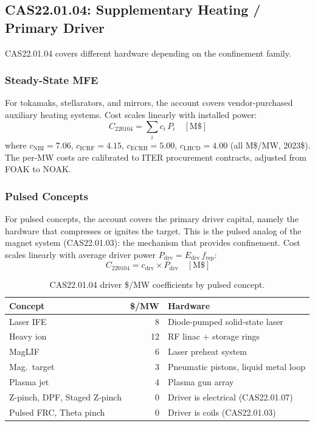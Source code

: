 \documentclass{article}
\begin{document}
\subsection{CAS22.01.04: Supplementary Heating / Primary Driver}
\label{sec:cas2204}

CAS22.01.04 covers different hardware depending on the confinement
family.

\subsubsection{Steady-State MFE}
For tokamaks, stellarators, and mirrors, the account covers
vendor-purchased auxiliary heating systems.  Cost scales linearly with
installed power:
\begin{equation}
C_{220104} = \sum_i c_i \, P_i \quad [\text{M\$}]
\end{equation}
where $c_{\text{NBI}} = 7.06$, $c_{\text{ICRF}} = 4.15$,
$c_{\text{ECRH}} = 5.00$, $c_{\text{LHCD}} = 4.00$ (all M\$/MW,
2023\$).  The per-MW costs are calibrated to ITER procurement contracts,
adjusted from FOAK to NOAK.

\subsubsection{Pulsed Concepts}
For pulsed concepts, the account covers the primary driver capital, namely
the hardware that compresses or ignites the target.  This is the pulsed
analog of the magnet system (CAS22.01.03): the mechanism that provides
confinement.  Cost scales linearly with average driver power
$P_{\text{drv}} = E_{\text{drv}} \, f_{\text{rep}}$:
\begin{equation}
C_{220104} = c_{\text{drv}} \times P_{\text{drv}} \quad [\text{M\$}]
\end{equation}

\begin{table}[htbp]
\caption{CAS22.01.04 driver \$/MW coefficients by pulsed concept.}
\label{tab:cas2204-driver}
\centering
\begin{tabular}{lrl}
\toprule
Concept & \$/MW & Hardware \\
\midrule
Laser IFE   &  8 & Diode-pumped solid-state laser \\
Heavy ion   & 12 & RF linac + storage rings \\
MagLIF      &  6 & Laser preheat system \\
Mag.\ target &  3 & Pneumatic pistons, liquid metal loop \\
Plasma jet  &  4 & Plasma gun array \\
\midrule
Z-pinch, DPF, Staged Z-pinch & 0 & Driver is electrical (CAS22.01.07) \\
Pulsed FRC, Theta pinch       & 0 & Driver is coils (CAS22.01.03) \\
\bottomrule
\end{tabular}
\end{table}
\end{document}
